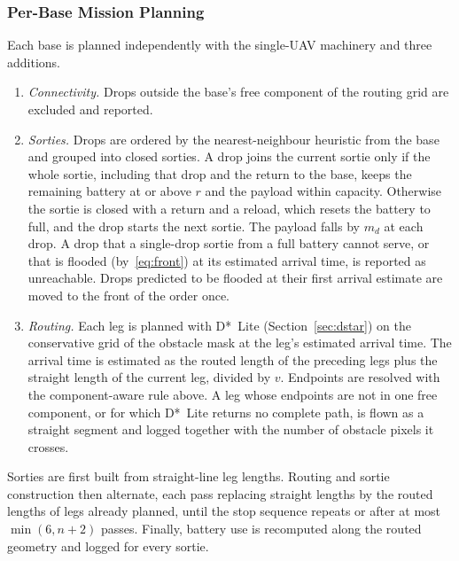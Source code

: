 \subsubsection{Per-Base Mission Planning}
Each base is planned independently with the single-UAV machinery and three additions.
\begin{enumerate}
\item \emph{Connectivity.} Drops outside the base's free component of the routing grid are excluded and reported.
\item \emph{Sorties.} Drops are ordered by the nearest-neighbour heuristic from the base and grouped into closed sorties. A drop joins the current sortie only if the whole sortie, including that drop and the return to the base, keeps the remaining battery at or above $r$ and the payload within capacity. Otherwise the sortie is closed with a return and a reload, which resets the battery to full, and the drop starts the next sortie. The payload falls by $m_d$ at each drop. A drop that a single-drop sortie from a full battery cannot serve, or that is flooded (by~\eqref{eq:front}) at its estimated arrival time, is reported as unreachable. Drops predicted to be flooded at their first arrival estimate are moved to the front of the order once.
\item \emph{Routing.} Each leg is planned with D*~Lite (Section~\ref{sec:dstar}) on the conservative grid of the obstacle mask at the leg's estimated arrival time. The arrival time is estimated as the routed length of the preceding legs plus the straight length of the current leg, divided by $v$. Endpoints are resolved with the component-aware rule above. A leg whose endpoints are not in one free component, or for which D*~Lite returns no complete path, is flown as a straight segment and logged together with the number of obstacle pixels it crosses.
\end{enumerate}
Sorties are first built from straight-line leg lengths. Routing and sortie construction then alternate, each pass replacing straight lengths by the routed lengths of legs already planned, until the stop sequence repeats or after at most $\min(6,n+2)$ passes. Finally, battery use is recomputed along the routed geometry and logged for every sortie.

